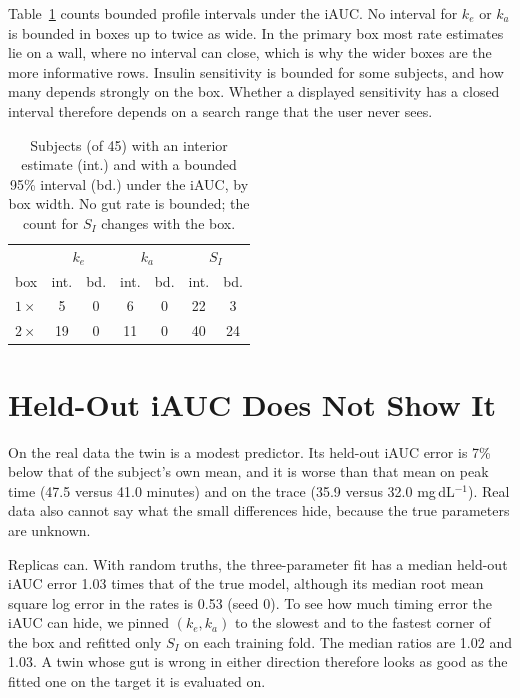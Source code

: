 \documentclass[letterpaper]{article} %
\newcommand{\resGainPct}{7}
\newcommand{\resNegZeroFastRefitIauc}{1.03}
\newcommand{\resNegZeroSlowRefitIauc}{1.02}
\newcommand{\resPeakGradThree}{47.5}
\newcommand{\resPeakPersonalMean}{41.0}
\newcommand{\resPvpRandomZeroRatio}{1.03}
\newcommand{\resPvpRandomZeroTiming}{0.53}
\newcommand{\resTraceRmseGradThree}{35.9}
\newcommand{\resTraceRmsePersonalMean}{32.0}
\newcommand{\wsBoxRange}{up to twice as wide}
\newcommand{\wsBoxRows}{$1\times$ & 5 & 0 & 6 & 0 & 22 & 3 \\ $2\times$ & 19 & 0 & 11 & 0 & 40 & 24 \\}
\newcommand{\wsN}{45}
\begin{document}
Table~\ref{tab:box} counts bounded profile intervals under the iAUC. No interval for $k_e$ or $k_a$ is bounded in boxes \wsBoxRange{}. In the primary box most rate estimates lie on a wall, where no interval can close, which is why the wider boxes are the more informative rows. Insulin sensitivity is bounded for some subjects, and how many depends strongly on the box. Whether a displayed sensitivity has a closed interval therefore depends on a search range that the user never sees.

\begin{table}[t]
\centering
\small
\begin{tabular}{lcccccc}
\toprule
 & \multicolumn{2}{c}{$k_e$} & \multicolumn{2}{c}{$k_a$} & \multicolumn{2}{c}{$S_I$} \\
box & int. & bd. & int. & bd. & int. & bd. \\
\midrule
\wsBoxRows
\bottomrule
\end{tabular}
\caption{Subjects (of \wsN{}) with an interior estimate (int.) and with a bounded 95\% interval (bd.) under the iAUC, by box width. No gut rate is bounded; the count for $S_I$ changes with the box.}
\label{tab:box}
\end{table}

\section{Held-Out iAUC Does Not Show It}\label{sec:prediction}

On the real data the twin is a modest predictor. Its held-out iAUC error is \resGainPct\% below that of the subject's own mean, and it is worse than that mean on peak time (\resPeakGradThree{} versus \resPeakPersonalMean{} minutes) and on the trace (\resTraceRmseGradThree{} versus \resTraceRmsePersonalMean{} mg\,dL$^{-1}$). Real data also cannot say what the small differences hide, because the true parameters are unknown.

Replicas can. With random truths, the three-parameter fit has a median held-out iAUC error \resPvpRandomZeroRatio{} times that of the true model, although its median root mean square log error in the rates is \resPvpRandomZeroTiming{} (seed 0). To see how much timing error the iAUC can hide, we pinned $(k_e,k_a)$ to the slowest and to the fastest corner of the box and refitted only $S_I$ on each training fold. The median ratios are \resNegZeroSlowRefitIauc{} and \resNegZeroFastRefitIauc{}. A twin whose gut is wrong in either direction therefore looks as good as the fitted one on the target it is evaluated on.
\end{document}
